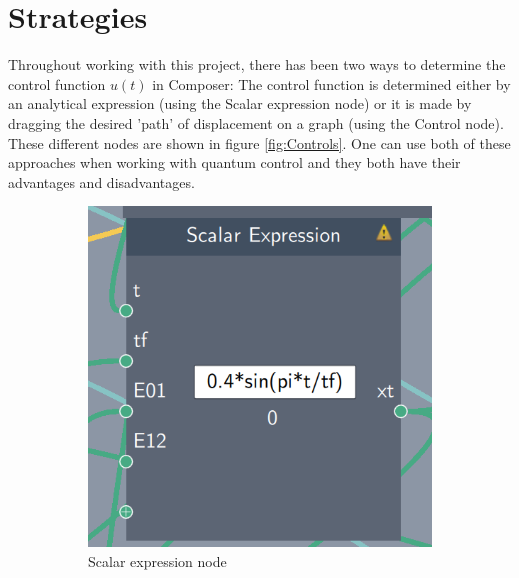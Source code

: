\documentclass[a4paper, twocolumn]{revtex4-1}
\begin{document}
\section{Strategies}\label{sec:strats}
Throughout working with this project, there has been two ways to determine the control function $u(t)$ in Composer: The control function is determined either by an analytical expression (using the Scalar expression node) or it is made by dragging the desired 'path' of displacement on a graph (using the Control node). These different nodes are shown in figure \ref{fig:Controls}. One can use both of these approaches when working with quantum control and they both have their advantages and disadvantages. \\

\begin{figure}[h]
	\begin{subfigure}[b]{0.4\columnwidth}
		\centering
		\includegraphics[width=\columnwidth]{graphics/composerScreens/ScalarExpressionNode.png}
		\caption{Scalar expression node}
	\end{subfigure}
	\hfill
	\begin{subfigure}[b]{0.45\columnwidth}
		\centering

\end{subfigure}
\end{figure}
\end{document}
